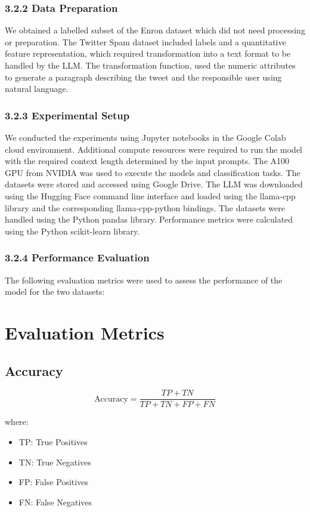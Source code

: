 \documentclass[letterpaper,twocolumn,fleqn]{article}
\begin{document}
\subsubsection{3.2.2 Data Preparation}
We obtained a labelled subset of the Enron dataset which did not need processing or preparation.
The Twitter Spam dataset included labels and a quantitative feature representation, which required transformation into a text format to be handled by the LLM. The transformation function, used the numeric attributes to generate a paragraph describing the tweet and the responsible user using natural language. 

\subsubsection{3.2.3 Experimental Setup}
We conducted the experiments using Jupyter notebooks in the Google Colab cloud environment. Additional compute resources were required to run the model with the required context length determined by the input prompts. The A100 GPU from NVIDIA was used to execute the models and classification tasks. The datasets were stored and accessed using Google Drive. The LLM was downloaded using the Hugging Face command line interface and loaded using the llama-cpp library and the corresponding llama-cpp-python bindings. The datasets were handled using the Python pandas library. Performance metrics were calculated using the Python scikit-learn library. 
\subsubsection{3.2.4 Performance Evaluation}
The following evaluation metrics were used to assess the performance of the model for the two datasets:

\section*{Evaluation Metrics}

\subsection*{Accuracy}

\begin{equation*}
  \text{Accuracy} = \frac{TP + TN}{TP + TN + FP + FN}
\end{equation*}

where:

\begin{itemize}
  \item TP: True Positives
  \item TN: True Negatives
  \item FP: False Positives
  \item FN: False Negatives
\end{itemize}
\end{document}
